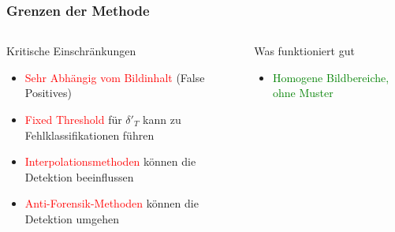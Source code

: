 \documentclass[11pt,t,usepdftitle=false,aspectratio=169]{beamer}
\begin{document}
\begin{frame}
	\frametitle{Grenzen der Methode}
	
	\begin{columns}[T]
		\begin{column}{0.48\textwidth}
			\begin{alertblock}{Kritische Einschränkungen}
				\begin{itemize}
					\item \textcolor{red}{Sehr Abhängig vom Bildinhalt} (False Positives)
					\item \textcolor{red}{Fixed Threshold} für $\delta'_T$ kann zu Fehlklassifikationen führen
					\item \textcolor{red}{Interpolationsmethoden} können die Detektion beeinflussen
					\item \textcolor{red}{Anti-Forensik-Methoden} können die Detektion umgehen~\cite{kirchner_hiding_2008}
				\end{itemize}
			\end{alertblock}
		\end{column}
		\begin{column}{0.48\textwidth}
			\begin{exampleblock}{Was funktioniert gut}
				\begin{itemize}
					\item \textcolor{green}{Homogene Bildbereiche, ohne Muster}
				\end{itemize}
			\end{exampleblock}
		\end{column}
	\end{columns}
	
	\vspace{1em}
	
\end{frame}
\end{document}
